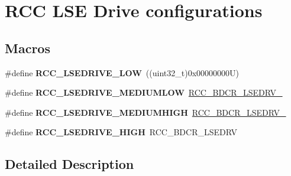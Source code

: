 \hypertarget{group___r_c_c___l_s_e_drive___configuration}{}\section{R\+CC L\+SE Drive configurations}
\label{group___r_c_c___l_s_e_drive___configuration}
\subsection*{Macros}
\begin{DoxyCompactItemize}
\item 
\mbox{\label{group___r_c_c___l_s_e_drive___configuration_gab5fa5b50304710db2d7f6d583a225da3}} 
\#define {\bfseries R\+C\+C\+\_\+\+L\+S\+E\+D\+R\+I\+V\+E\+\_\+\+L\+OW}~((uint32\+\_\+t)0x00000000\+U)
\item 
\mbox{\label{group___r_c_c___l_s_e_drive___configuration_ga1151beb7f9869e91fe7617936ad0efff}} 
\#define {\bfseries R\+C\+C\+\_\+\+L\+S\+E\+D\+R\+I\+V\+E\+\_\+\+M\+E\+D\+I\+U\+M\+L\+OW}~\mbox{\hyperlink{group___peripheral___registers___bits___definition_gaa9a3c17caf7eb216d874b7cf1d90358e}{R\+C\+C\+\_\+\+B\+D\+C\+R\+\_\+\+L\+S\+E\+D\+R\+V\+\_}}
\item 
\mbox{\label{group___r_c_c___l_s_e_drive___configuration_ga295eed1e1368d526fa0f6356ceecbc48}} 
\#define {\bfseries R\+C\+C\+\_\+\+L\+S\+E\+D\+R\+I\+V\+E\+\_\+\+M\+E\+D\+I\+U\+M\+H\+I\+GH}~\mbox{\hyperlink{group___peripheral___registers___bits___definition_ga2bf168a5913ecf4eb6eb5f87a825aa58}{R\+C\+C\+\_\+\+B\+D\+C\+R\+\_\+\+L\+S\+E\+D\+R\+V\+\_}}
\item 
\mbox{\label{group___r_c_c___l_s_e_drive___configuration_ga90b0854f3813d7ab2781519bfa58fd95}} 
\#define {\bfseries R\+C\+C\+\_\+\+L\+S\+E\+D\+R\+I\+V\+E\+\_\+\+H\+I\+GH}~R\+C\+C\+\_\+\+B\+D\+C\+R\+\_\+\+L\+S\+E\+D\+RV
\end{DoxyCompactItemize}


\subsection{Detailed Description}
